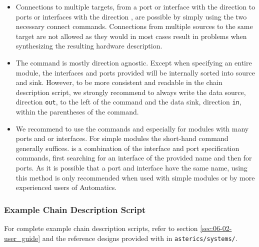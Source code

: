 \begin{itemize}
\item Connections to multiple targets, from a port or interface with the direction  to ports or interfaces with the direction , are possible by simply using the two necessary connect commands.
Connections from multiple sources to the same target are not allowed as they would in most cases result in problems when synthesizing the resulting hardware description.
\item The  command is mostly direction agnostic.
Except when specifying an entire module, the interfaces and ports provided will be internally sorted into source and sink.
However, to be more consistent and readable in the chain description script, we strongly recommend to always write the data source, direction \texttt{out}, to the left of the  command and the data sink, direction \texttt{in}, within the parentheses of the  command.
\item We recommend to use the commands  and  especially for modules with many ports and or interfaces.
For simple modules the short-hand command  generally suffices.
 is a combination of the interface and port specification commands, first searching for an interface of the provided name and then for ports.
As it is possible that a port and interface have the same name, using this method is only recommended when used with simple modules or by more experienced users of Automatics.
\end{itemize}

\subsubsection{Example Chain Description Script}
\label{ssec:02-example-script}

For complete example chain description scripts, refer to section \ref{sec:06-02-user_guide} and the reference designs provided with \asterics in \texttt{asterics/systems/}.

